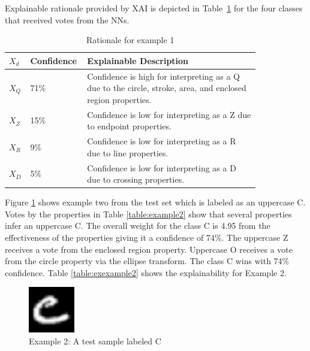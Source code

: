 \documentclass[conference]{IEEEtran}
\begin{document}
Explainable rationale provided by XAI is depicted in Table~\ref{table:exexample1} for the four classes that
received votes from the NNs.

\begin{table}
    \caption{Rationale for example 1}
    \centering
    \begin{tabular}{| p{0.04\linewidth} | p{0.14\linewidth} | p{0.65\linewidth} |}
    \hline
     $X_d$ & Confidence & Explainable Description \\
    \hline \cline{1-3}
    $X_Q$ & 71\% & Confidence is high for interpreting as a Q due to the circle, stroke, area, and enclosed region properties. \\ 
    \hline
    $X_Z$ & 15\% & Confidence is low for interpreting as a Z due to endpoint properties. \\
    \hline
    $X_R$ & 9\% & Confidence is low for interpreting as a R due to line properties. \\
    \hline
    $X_D$ & 5\% & Confidence is low for interpreting as a D due to crossing properties. \\
    \hline
    \end{tabular}
    \label{table:exexample1}
\end{table}

Figure \ref{fig:ex2} shows example two from the test set which is labeled as an
uppercase C. Votes by the properties in Table \ref{table:example2} show that
several properties infer an uppercase C.  The overall weight for the class C is 4.95 from the effectiveness
of the properties giving it a confidence of 74\%. The uppercase Z receives a
vote from the enclosed region property. Uppercase O receives a vote from the
circle property via the ellipse transform.  The class C wins with 74\% confidence.
Table \ref{table:exexample2} shows the explainability for Example 2.

\begin{figure}
    \centering
    \includegraphics[width=2cm]{./images/examples/test-C-1.png}
    \caption{Example 2: A test sample labeled C}
    \label{fig:ex2}
\end{figure}
\end{document}
